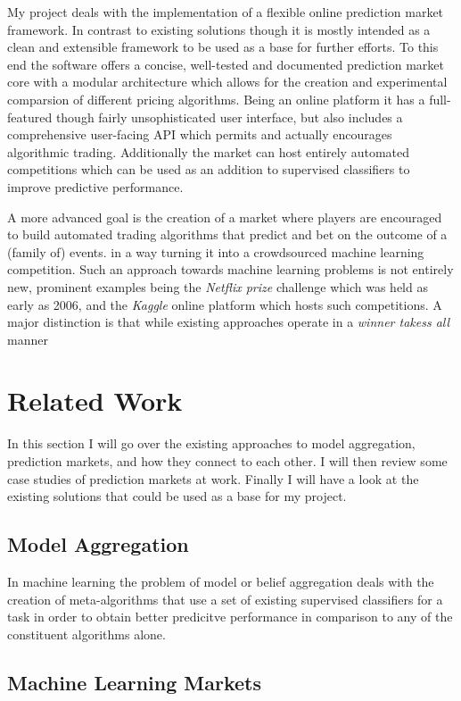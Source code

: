 \documentclass[bsc,frontabs,twoside,singlespacing,parskip,deptreport]{infthesis}     %
\begin{document}
	My project deals with the implementation of a flexible online prediction market framework. In contrast to existing solutions  though it is mostly intended as a clean and extensible framework to be used as a base for further efforts. To this end the software offers a concise, well-tested and documented prediction market core with a modular architecture which allows for the creation and experimental comparsion of different pricing algorithms. Being an online platform it has a full-featured though fairly unsophisticated user interface, but also includes a comprehensive user-facing API which permits and actually encourages algorithmic trading. Additionally the market can host entirely automated competitions which can be used as an addition to supervised classifiers to improve predictive performance. 

	A more advanced goal is the creation of a market where players are encouraged to build automated trading algorithms that predict and bet on the outcome of a (family of) events.  in a way turning it into a crowdsourced machine learning competition. Such an approach towards machine learning problems is not entirely new, prominent examples being the {\em Netflix prize} challenge which was held as early as 2006, and the {\em Kaggle} online platform which hosts such competitions. A major distinction is that while existing approaches operate in a {\em winner takess all} manner

\chapter{Related Work}

	In this section I will go over the existing approaches to model aggregation, prediction markets, and how they connect to each other. I will then review some case studies of prediction markets at work. Finally I will have a look at the existing solutions that could be used as a base for my project. 

\section{Model Aggregation}
	In machine learning the problem of model or belief aggregation deals with the creation of meta-algorithms that use a set of existing supervised classifiers for a task in order to obtain better predicitve performance in comparison to any of the constituent algorithms alone. 

\section{Machine Learning Markets}
\end{document}
